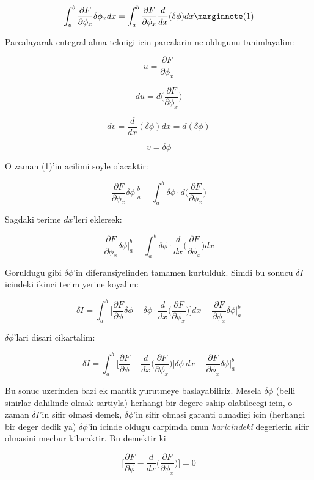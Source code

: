 \documentclass[12pt,fleqn]{article}\usepackage{../common}
\begin{document}
\[
\int_{a}^{b} \frac{\partial F}{\partial \phi_x}\delta\phi_x dx =
\int_{a}^{b} \frac{\partial F}{\partial \phi_x} \frac{d}{dx}(\delta \phi) dx 
\mlabel{1}
\]

Parcalayarak entegral alma teknigi icin parcalarin ne oldugunu tanimlayalim:

\[ u = \frac{\partial F}{\partial \phi_x}  \]

\[ du  = d \bigg( \frac{\partial F}{\partial \phi_x} \bigg) \]

\[ dv  = \frac{d}{dx}(\delta \phi)dx = d(\delta \phi) \]

\[ v  = \delta \phi \]

O zaman (1)'in acilimi soyle olacaktir:

\[ 
\frac{\partial F}{\partial \phi_x} \delta \phi \bigg|_a^b - 
\int_a^b \delta \phi \cdot d \bigg( \frac{\partial F}{\partial \phi_x} \bigg)
 \]

Sagdaki terime $dx$'leri eklersek:

\[ 
\frac{\partial F}{\partial \phi_x} \delta \phi \bigg|_a^b - 
\int_a^b \delta \phi \cdot \frac{d}{dx} \bigg( \frac{\partial F}{\partial \phi_x} \bigg) dx
 \]

Goruldugu gibi $\delta \phi$'in diferansiyelinden tamamen kurtulduk. Simdi bu
sonucu $\delta I$ icindeki ikinci terim yerine koyalim:

\[ 
\delta I  = \int_{a}^{b} 
\bigg[ \frac{\partial F}{\partial \phi}\delta\phi -
\delta \phi \cdot \frac{d}{dx} \bigg( \frac{\partial F}{\partial \phi_x} \bigg)
\bigg] dx - \frac{\partial F}{\partial \phi_x} \delta \phi \bigg|_a^b 
 \]

$\delta \phi$'lari disari cikartalim:

\[ 
\delta I  = \int_{a}^{b} \bigg[
\frac{\partial F}{\partial \phi} -
\frac{d}{dx} \bigg( \frac{\partial F}{\partial \phi_x} \bigg)
\bigg] \delta\phi \ dx
- \frac{\partial F}{\partial \phi_x} \delta \phi \bigg|_a^b 
 \]

Bu sonuc uzerinden bazi ek mantik yurutmeye baslayabiliriz. Mesela $\delta \phi$
(belli sinirlar dahilinde olmak sartiyla) herhangi bir degere sahip olabilecegi
icin, o zaman $\delta I$'in sifir olmasi demek, $\delta \phi$'in sifir olmasi
garanti olmadigi icin (herhangi bir deger dedik ya) $\delta \phi$'in icinde
oldugu carpimda onun {\em haricindeki} degerlerin sifir olmasini mecbur
kilacaktir. Bu demektir ki

\[ 
\bigg[
\frac{\partial F}{\partial \phi} -
\frac{d}{dx} \bigg( \frac{\partial F}{\partial \phi_x} \bigg)
\bigg] = 0
 \]
\end{document}
